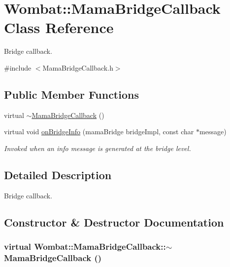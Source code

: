 \hypertarget{classWombat_1_1MamaBridgeCallback}{
\section{Wombat::MamaBridgeCallback Class Reference}
\label{classWombat_1_1MamaBridgeCallback}
}


Bridge callback.  


{\ttfamily \#include $<$MamaBridgeCallback.h$>$}\subsection*{Public Member Functions}
\begin{DoxyCompactItemize}
\item 
virtual \hyperlink{classWombat_1_1MamaBridgeCallback_acf92b652cde7875b063c5a4694ac58e6}{$\sim$MamaBridgeCallback} ()
\item 
virtual void \hyperlink{classWombat_1_1MamaBridgeCallback_abeee9bb398dabab847fc5307940ad832}{onBridgeInfo} (mamaBridge bridgeImpl, const char $\ast$message)
\begin{DoxyCompactList}\small\item\em Invoked when an info message is generated at the bridge level. \item\end{DoxyCompactList}\end{DoxyCompactItemize}


\subsection{Detailed Description}
Bridge callback. 

\subsection{Constructor \& Destructor Documentation}
\hypertarget{classWombat_1_1MamaBridgeCallback_acf92b652cde7875b063c5a4694ac58e6}{
\subsubsection[{$\sim$MamaBridgeCallback}]{\setlength{\rightskip}{0pt plus 5cm}virtual Wombat::MamaBridgeCallback::$\sim$MamaBridgeCallback ()}}
\label{classWombat_1_1MamaBridgeCallback_acf92b652cde7875b063c5a4694ac58e6}



